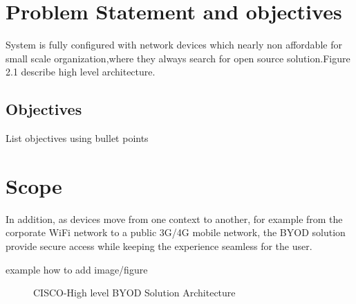 \section{Problem Statement and objectives}
\par System is fully configured with network devices which nearly non affordable for small scale organization,where they always search for open source solution.Figure 2.1 describe high level architecture.
\subsection{Objectives}List objectives using bullet points
\section{Scope}
\par In addition, as devices move from one context to another, for example from the corporate WiFi network to a public 3G/4G mobile network, the BYOD solution provide secure access while keeping the experience seamless for the user.
\par example how to add image/figure
\begin{figure}[h!]
\begin{center}
\end{center}
\caption {CISCO-High level BYOD Solution Architecture}
\label{vmb2}
\vspace{0mm}
\end{figure} 
  

